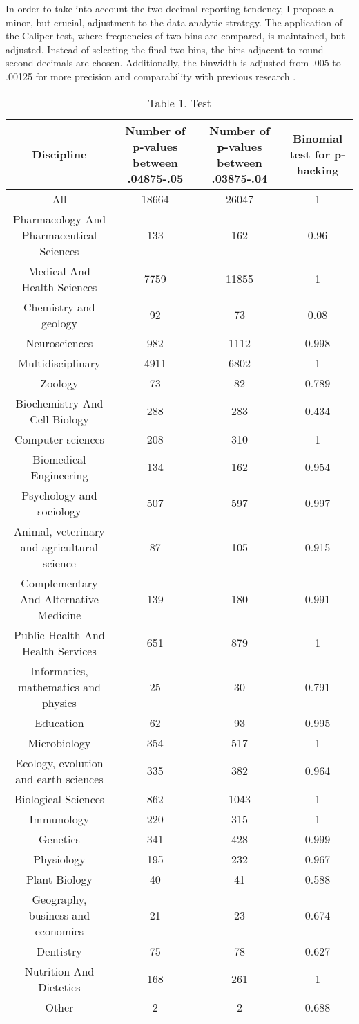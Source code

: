 In order to take into account the two-decimal reporting tendency, I propose a minor, but crucial, adjustment to the data analytic strategy. The application of the Caliper test, where frequencies of two bins are compared, is maintained, but adjusted. Instead of selecting the final two bins, the bins adjacent to round second decimals are chosen. Additionally, the binwidth is adjusted from .005 to .00125 for more precision and comparability with previous research \cite{Masicampo2012, Leggett2013}.
\begin{table}
\begin{tabular}{ c c c c }
     Discipline & Number of p-values between .04875-.05 & Number of p-values between .03875-.04 & Binomial test for p-hacking \\
     \hline
    All   & 18664 & 26047 & 1 \\
    Pharmacology And Pharmaceutical Sciences & 133   & 162   & 0.96 \\
    Medical And Health Sciences & 7759  & 11855 & 1 \\
    Chemistry and geology & 92    & 73    & 0.08 \\
    Neurosciences & 982   & 1112  & 0.998 \\
    Multidisciplinary & 4911  & 6802  & 1 \\
    Zoology & 73    & 82    & 0.789 \\
    Biochemistry And Cell Biology & 288   & 283   & 0.434 \\
    Computer sciences & 208   & 310   & 1 \\
    Biomedical Engineering & 134   & 162   & 0.954 \\
    Psychology and sociology & 507   & 597   & 0.997 \\
    Animal, veterinary and agricultural science & 87    & 105   & 0.915 \\
    Complementary And Alternative Medicine & 139   & 180   & 0.991 \\
    Public Health And Health Services & 651   & 879   & 1 \\
    Informatics, mathematics and physics & 25    & 30    & 0.791 \\
    Education & 62    & 93    & 0.995 \\
    Microbiology & 354   & 517   & 1 \\
    Ecology, evolution and earth sciences & 335   & 382   & 0.964 \\
    Biological Sciences & 862   & 1043  & 1 \\
    Immunology & 220   & 315   & 1 \\
    Genetics & 341   & 428   & 0.999 \\
    Physiology & 195   & 232   & 0.967 \\
    Plant Biology & 40    & 41    & 0.588 \\
    Geography, business and economics & 21    & 23    & 0.674 \\
    Dentistry & 75    & 78    & 0.627 \\
    Nutrition And Dietetics & 168   & 261   & 1 \\
    Other & 2     & 2     & 0.688 \\
\end{tabular}
\caption{Table 1. Test}
\end{table}